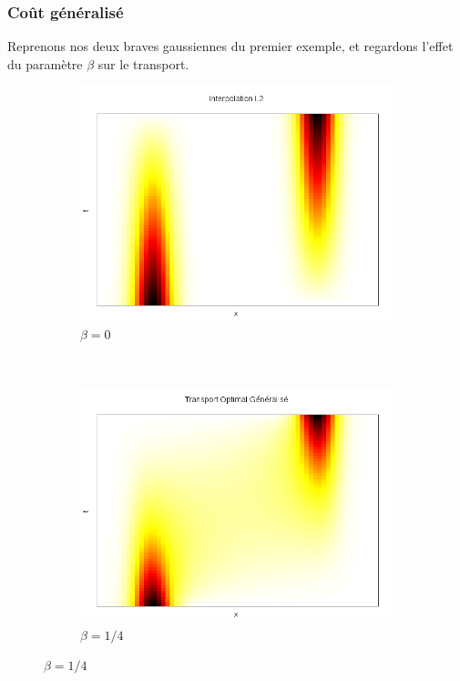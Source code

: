 \documentclass[a4paper,12pt]{article}
\begin{document}
\subsubsection{Coût généralisé}
Reprenons nos deux braves gaussiennes du premier exemple, et regardons l'effet du paramètre $\beta$ sur le transport. 
\begin{figure}[!h]
\centering 
	
	\begin{subfigure}[b]{0.48\linewidth}
	\includegraphics[width=\textwidth]{img/1DGeneralise/transport0.png}
	\caption{$\beta = 0$}
	\end{subfigure}
	~
	\begin{subfigure}[b]{0.48\linewidth}
	\includegraphics[width=\textwidth]{img/1DGeneralise/transport25.png}
	\caption{$\beta = 1/4$}
	\end{subfigure}	
	

\end{figure}
\end{document}
